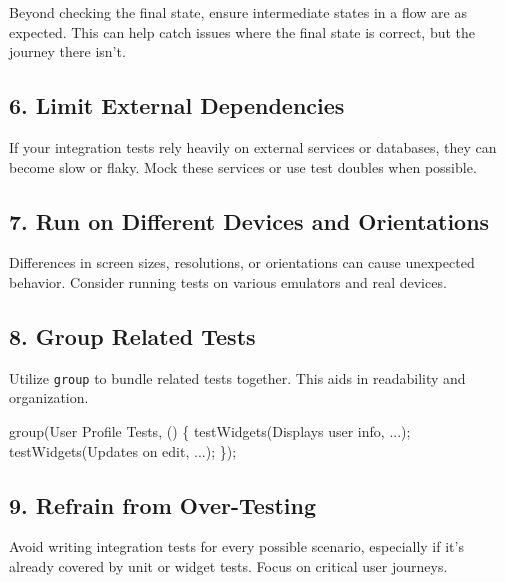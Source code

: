 \documentclass[
]{article}
\newenvironment{Shaded}{\begin{snugshade}}{\end{snugshade}}
\newcommand{\NormalTok}[1]{\textcolor[rgb]{0.81,0.81,0.76}{#1}}
\newcommand{\OperatorTok}[1]{\textcolor[rgb]{0.81,0.81,0.76}{#1}}
\newcommand{\StringTok}[1]{\textcolor[rgb]{0.96,0.31,0.31}{#1}}
\begin{document}
Beyond checking the final state, ensure intermediate states in a flow
are as expected. This can help catch issues where the final state is
correct, but the journey there isn't.

\subsection{6. Limit External
Dependencies}\label{limit-external-dependencies}

If your integration tests rely heavily on external services or
databases, they can become slow or flaky. Mock these services or use
test doubles when possible.

\subsection{7. Run on Different Devices and
Orientations}\label{run-on-different-devices-and-orientations}

Differences in screen sizes, resolutions, or orientations can cause
unexpected behavior. Consider running tests on various emulators and
real devices.

\subsection{8. Group Related Tests}\label{group-related-tests}

Utilize \texttt{group} to bundle related tests together. This aids in
readability and organization.

\begin{Shaded}
\begin{Highlighting}[]
\NormalTok{group(}\StringTok{\textquotesingle{}User Profile Tests\textquotesingle{}}\OperatorTok{,}\NormalTok{ () }\OperatorTok{\{}
\NormalTok{  testWidgets(}\StringTok{\textquotesingle{}Displays user info\textquotesingle{}}\OperatorTok{,} \OperatorTok{...}\NormalTok{);}
\NormalTok{  testWidgets(}\StringTok{\textquotesingle{}Updates on edit\textquotesingle{}}\OperatorTok{,} \OperatorTok{...}\NormalTok{);}
\OperatorTok{\}}\NormalTok{);}
\end{Highlighting}
\end{Shaded}

\subsection{9. Refrain from
Over-Testing}\label{refrain-from-over-testing}

Avoid writing integration tests for every possible scenario, especially
if it's already covered by unit or widget tests. Focus on critical user
journeys.
\end{document}
